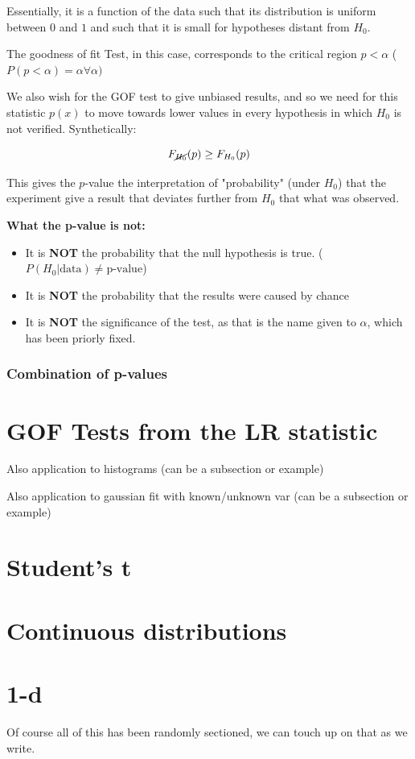 Essentially, it is a function of the data such that its distribution is uniform between $0$ and $1$ and such that it is small for hypotheses distant from $H_0$.

The goodness of fit Test, in this case, corresponds to the critical region $p<\alpha$ ($P(p<\alpha)=\alpha\forall\alpha)$

We also wish for the GOF test to give unbiased results, and so we need for this statistic $p(x)$ to move towards lower values in every hypothesis in which $H_0$ is not verified. Synthetically:

	\[
	F_{\cancel{H_0}}(p) \geq F_{H_0}(p)
	\]

This gives the $p$-value the interpretation of "probability" (under $H_0$) that the experiment give a result that deviates further from $H_0$ that what was observed. 

\textbf{What the p-value is not:}
\begin{itemize}
	\item It is \textbf{NOT} the probability that the null hypothesis is true. ($P(H_0 | \text{data}) \neq \text{p-value}$)
	\item It is \textbf{NOT} the probability that the results were caused by chance
	\item It is \textbf{NOT} the significance of the test, as that is the name given to $\alpha$, which has been priorly fixed.  
\end{itemize}




\subsubsection{Combination of p-values}

\section{GOF Tests from the LR statistic}
Also application to histograms (can be a subsection or example)


Also application to gaussian fit with known/unknown var (can be a subsection or example)

\section{Student's t}

\section{Continuous distributions}

\section{1-d}

Of course all of this has been randomly sectioned, we can touch up on that as we write. 